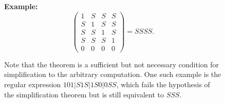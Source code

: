 \documentclass[runningheads]{llncs}
\begin{document}
\begin{figure}[h!]
\begin{minipage}{.50\textwidth}
    \noindent \textbf{Example:}
    \vspace{-0.05\textwidth}
    \begin{equation*}
        \begin{pmatrix} \label{example1_regex_simp_thm}
        1 & S & S & S\\
        S & 1 & S & S\\
        S & S & 1 & S\\
        S & S & S & 1\\
        0 & 0 & 0 & 0
        \end{pmatrix} = SSSS.
    \end{equation*}
    \end{minipage}
    \begin{minipage}{.50\textwidth}
    Note that the theorem is a sufficient but not necessary condition for simplification to the arbitrary computation. One such example is the regular expression $101|S1S|1S0|0SS$, which fails the hypothesis of the  simplification theorem but is still equivalent to $SSS$.
    \end{minipage}
\end{figure}
\end{document}
